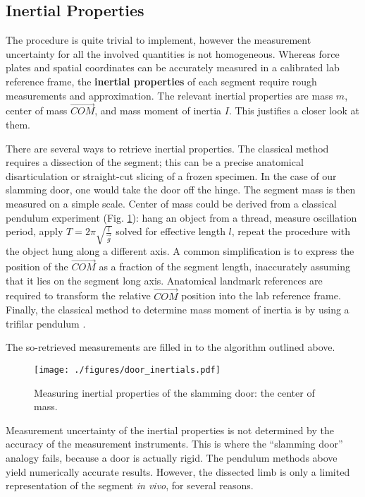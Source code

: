 \subsection{Inertial Properties}
\label{sec:org6ffd610}
The procedure is quite trivial to implement, however the measurement uncertainty for all the involved quantities is not homogeneous.
Whereas force plates and spatial coordinates can be accurately measured in a calibrated lab reference frame, the \textbf{inertial properties} of each segment require rough measurements and approximation.
The relevant inertial properties are mass \(m\), center of mass \(\vec{COM}\), and mass moment of inertia \(I\).
This justifies a closer look at them.


There are several ways to retrieve inertial properties.
The classical method requires a dissection of the segment; this can be a precise anatomical disarticulation or straight-cut slicing of a frozen specimen.
In the case of our slamming door, one would take the door off the hinge.
The segment mass is then measured on a simple scale.
Center of mass could be derived from a classical pendulum experiment (Fig. \ref{fig:door_inertials}): hang an object from a thread, measure oscillation period, apply \(T=2\pi\sqrt{\frac{l}{\vec{g}}}\) solved for effective length \(l\), repeat the procedure with the object hung along a different axis.
A common simplification is to express the position of the \(\vec{COM}\) as a fraction of the segment length, inaccurately assuming that it lies on the segment long axis.
Anatomical landmark references are required to transform the relative \(\vec{COM}\) position into the lab reference frame.
Finally, the classical method to determine mass moment of inertia is by using a trifilar pendulum \citep{Schedlinski2001,Korr1962,Wells1987}.

The so-retrieved measurements are filled in to the algorithm outlined above.


\begin{figure}[p]
\centering
\texttt{[image: ./figures/door\_inertials.pdf]}
\caption{\label{fig:door_inertials}Measuring inertial properties of the slamming door: the center of mass.}
\end{figure}


Measurement uncertainty of the inertial properties is not determined by the accuracy of the measurement instruments.
This is where the ``slamming door'' analogy fails, because a door is actually rigid.
The pendulum methods above yield numerically accurate results.
However, the dissected limb is only a limited representation of the segment \emph{in vivo}, for several reasons.

